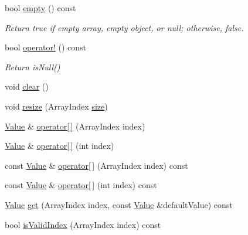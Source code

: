 \begin{DoxyCompactItemize}
\mbox{\label{classJson_1_1Value_a0519a551e37ee6665d74742b3f96bab3}} 
bool \hyperlink{classJson_1_1Value_a0519a551e37ee6665d74742b3f96bab3}{empty} () const
\begin{DoxyCompactList}\small\item\em Return true if empty array, empty object, or null; otherwise, false. \end{DoxyCompactList}\item 
\mbox{\label{classJson_1_1Value_a731b89fb4764c39ce2328e1707c822b9}} 
bool \hyperlink{classJson_1_1Value_a731b89fb4764c39ce2328e1707c822b9}{operator!} () const
\begin{DoxyCompactList}\small\item\em Return is\+Null() \end{DoxyCompactList}\item 
void \hyperlink{classJson_1_1Value_a501a4d67e6c875255c2ecc03ccd2019b}{clear} ()
\item 
void \hyperlink{classJson_1_1Value_aa284353271ada427dbfa04a42f2be407}{resize} (Array\+Index \hyperlink{classJson_1_1Value_a0ec2808e1d7efa4e9fad938d6667be44}{size})
\item 
\hyperlink{classJson_1_1Value}{Value} \& \hyperlink{classJson_1_1Value_a7d99f5dba388cdaa152ce6ef933d64ef}{operator\mbox{[}$\,$\mbox{]}} (Array\+Index index)
\item 
\hyperlink{classJson_1_1Value}{Value} \& \hyperlink{classJson_1_1Value_ac9182982c361e0ab621134d406e5f250}{operator\mbox{[}$\,$\mbox{]}} (int index)
\item 
const \hyperlink{classJson_1_1Value}{Value} \& \hyperlink{classJson_1_1Value_a46607236038b29695ed80c15895271e4}{operator\mbox{[}$\,$\mbox{]}} (Array\+Index index) const
\item 
const \hyperlink{classJson_1_1Value}{Value} \& \hyperlink{classJson_1_1Value_a0b42557a95621a4676b46a21ffc5e949}{operator\mbox{[}$\,$\mbox{]}} (int index) const
\item 
\hyperlink{classJson_1_1Value}{Value} \hyperlink{classJson_1_1Value_a034eb7bf85a44fa759bdaa232788ca66}{get} (Array\+Index index, const \hyperlink{classJson_1_1Value}{Value} \&default\+Value) const
\item 
\mbox{\label{classJson_1_1Value_ac2928f174a6e081c1500c28c2d61ee93}} 
bool \hyperlink{classJson_1_1Value_ac2928f174a6e081c1500c28c2d61ee93}{is\+Valid\+Index} (Array\+Index index) const

\end{DoxyCompactItemize}
